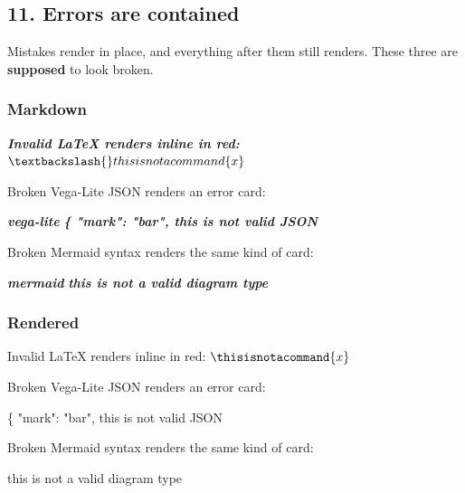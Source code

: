 \documentclass[
]{article}
\newenvironment{Shaded}{}{}
\newcommand{\AnnotationTok}[1]{\textcolor[rgb]{0.38,0.63,0.69}{\textbf{\textit{#1}}}}
\newcommand{\CommentTok}[1]{\textcolor[rgb]{0.38,0.63,0.69}{\textit{#1}}}
\newcommand{\InformationTok}[1]{\textcolor[rgb]{0.38,0.63,0.69}{\textbf{\textit{#1}}}}
\newcommand{\NormalTok}[1]{#1}
\begin{document}
\subsection{11. Errors are contained}\label{errors-are-contained}

Mistakes render in place, and everything after them still renders. These
three are \textbf{supposed} to look broken.

\subsubsection{Markdown}\label{markdown-11}

\begin{Shaded}
\begin{Highlighting}[]
\AnnotationTok{Invalid LaTeX renders inline in red:}\CommentTok{ $\textbackslash{}thisisnotacommand\{x\}$}

\NormalTok{Broken Vega{-}Lite JSON renders an error card:}

\InformationTok{\textasciigrave{}\textasciigrave{}\textasciigrave{}vega{-}lite}
\InformationTok{\{ "mark": "bar", this is not valid JSON}
\InformationTok{\textasciigrave{}\textasciigrave{}\textasciigrave{}}

\NormalTok{Broken Mermaid syntax renders the same kind of card:}

\InformationTok{\textasciigrave{}\textasciigrave{}\textasciigrave{}mermaid}
\InformationTok{this is not a valid diagram type}
\InformationTok{\textasciigrave{}\textasciigrave{}\textasciigrave{}}
\end{Highlighting}
\end{Shaded}

\subsubsection{Rendered}\label{rendered-11}

Invalid LaTeX renders inline in red: \(\thisisnotacommand{x}\)

Broken Vega-Lite JSON renders an error card:

\begin{Shaded}
\begin{Highlighting}[]
\NormalTok{\{ "mark": "bar", this is not valid JSON}
\end{Highlighting}
\end{Shaded}

Broken Mermaid syntax renders the same kind of card:

\begin{Shaded}
\begin{Highlighting}[]
\NormalTok{this is not a valid diagram type}
\end{Highlighting}
\end{Shaded}
\end{document}
